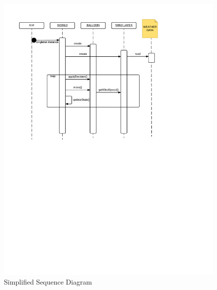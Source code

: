 \begin{figure}[H]
    \centering
    \includegraphics[width=\textwidth, trim= 1cm 12cm 4cm 1cm, clip]{graphics/sequenceDiagram.pdf}
    \caption{Simplified Sequence Diagram}
    \label{fig:seq_diagram}
\end{figure}

